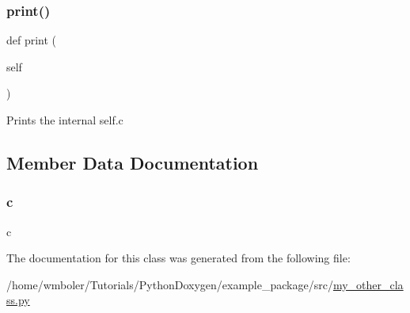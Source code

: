 \subsubsection{\texorpdfstring{print()}{print()}}
{\footnotesize\ttfamily def print (\begin{DoxyParamCaption}\item[{}]{self }\end{DoxyParamCaption})}

\begin{DoxyVerb}Prints the internal self.c
\end{DoxyVerb}
 

\subsection{Member Data Documentation}
\mbox{\label{classsrc_1_1my__other__class_1_1MyOtherClass_ae0323a9039add2978bf5b49550572c7c}} 
\subsubsection{\texorpdfstring{c}{c}}
{\footnotesize\ttfamily c}



The documentation for this class was generated from the following file\+:\begin{DoxyCompactItemize}
\item 
/home/wmboler/\+Tutorials/\+Python\+Doxygen/example\+\_\+package/src/\hyperlink{my__other__class_8py}{my\+\_\+other\+\_\+class.\+py}\end{DoxyCompactItemize}
